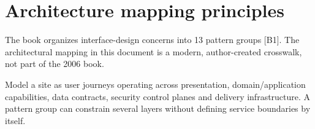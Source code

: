 \documentclass[11pt]{article}
\begin{document}
\MakeFront
\section{Architecture mapping principles}

\Provenance
\begin{groundedbox}The book organizes interface-design concerns into 13 pattern groups [B1]. The architectural mapping in this document is a modern, author-created crosswalk, not part of the 2006 book.\end{groundedbox}
\begin{modernbox}Model a site as user journeys operating across presentation, domain/application capabilities, data contracts, security control planes and delivery infrastructure. A pattern group can constrain several layers without defining service boundaries by itself.\end{modernbox}
\end{document}
